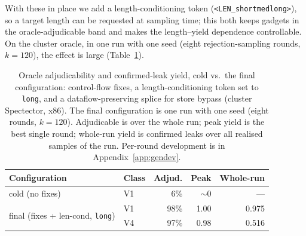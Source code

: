 \documentclass[conference]{IEEEtran}
\begin{document}
With these in place we add a length-conditioning token
(\texttt{<LEN\_short\textbar med\textbar long>}), so a target length can be
requested at sampling time; this both keeps gadgets in the oracle-adjudicable
band and makes the length--yield dependence controllable. On the cluster oracle,
in one run with one seed (eight rejection-sampling rounds, $k{=}120$), the effect is large
(Table~\ref{tab:adjud}).

\begin{table}[t]
\centering
\caption{Oracle adjudicability and confirmed-leak yield, cold vs.\ the final
  configuration: control-flow fixes, a length-conditioning token set to
  \texttt{long}, and a dataflow-preserving splice for store bypass (cluster
  Spectector, x86). The final configuration is one run with one seed (eight
  rounds, $k{=}120$). Adjudicable is over the whole run; peak yield is the best
  single round; whole-run yield is confirmed leaks over all realised samples
  of the run. Per-round development is in Appendix~\ref{app:gendev}.}
\label{tab:adjud}
\footnotesize
\setlength{\tabcolsep}{4pt}
\begin{tabular}{@{}llrrr@{}}
\toprule
Configuration & Class & Adjud. & Peak & Whole-run \\
\midrule
cold (no fixes)        & V1 & 6\% & $\sim$0 & --- \\
\midrule
\multirow{2}{*}{final (fixes + len-cond, \texttt{long})}
                       & V1 & 98\% & 1.00 & 0.975 \\
                       & V4 & 97\% & 0.98 & 0.516 \\
\bottomrule
\end{tabular}
\end{table}
\end{document}
